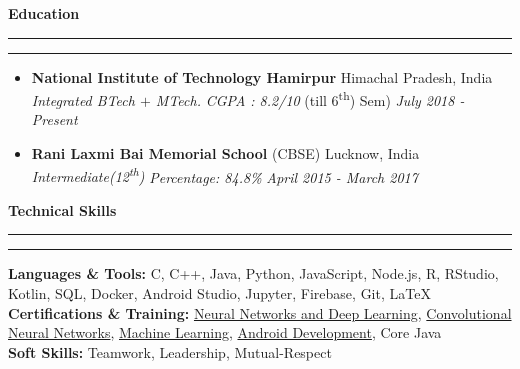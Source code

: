 \documentclass[11pt]{article}
\begin{document}
    \textbf{\large{Education}}
    	\vspace{5pt}
    	\hrule \hrule
    	\vspace{-4pt}
    	\begin{itemize}
    		\setlength{\itemsep}{4pt}
        	\setlength{\parskip}{0pt}
        	\setlength{\parsep}{4pt}
        	\item \textbf{National Institute of Technology Hamirpur} \hfill Himachal Pradesh, India\\
        	\textsl{Integrated BTech $+$ MTech.} \textit{CGPA : 8.2/10}  (till 6\textsuperscript{th}) Sem)
        	\hfill 
        	\textit{July 2018 - Present}
        	\item \textbf{Rani Laxmi Bai Memorial School} (CBSE) \hfill Lucknow, India\\
        	\textsl{Intermediate(12\textsuperscript{th}) } \textit{Percentage: 84.8\%}  \hfill 
        	\textit{April 2015 - March 2017}
    	\end{itemize}
    \vspace{2pt}
    \textbf{Technical Skills}
    	\vspace{5pt}
    	\hrule \hrule
    	\vspace{4pt}
    	\textbf{Languages \& Tools:} C, C++, Java, Python, JavaScript, Node.js, R, RStudio, Kotlin, SQL, Docker, Android Studio, Jupyter, Firebase, Git, \LaTeX\\
        \textbf{Certifications \& Training:} \href{https://drive.google.com/file/d/1mir_TBy9GinXpSU3H-8LyYn68GkcM62f/view?usp=sharing}{Neural Networks and Deep Learning}, \href{https://drive.google.com/file/d/18cQMPfNLtvY4-Ozh7hZnUIDKYh9tRYPG/view?usp=sharing}{Convolutional Neural Networks}, \href{https://drive.google.com/file/d/13L4JKQ1pwLG9YVevPVZLNRLUeZWGkvyU/view?usp=sharing}{Machine Learning}, \href{https://drive.google.com/file/d/1Hp5dvhNVz9FvjQ6Y4vIVZldKpb8m8LCp/view?usp=sharing}{Android Development}, Core Java\\
        \textbf{Soft Skills:} Teamwork, Leadership, Mutual-Respect\\
   
\end{document}
